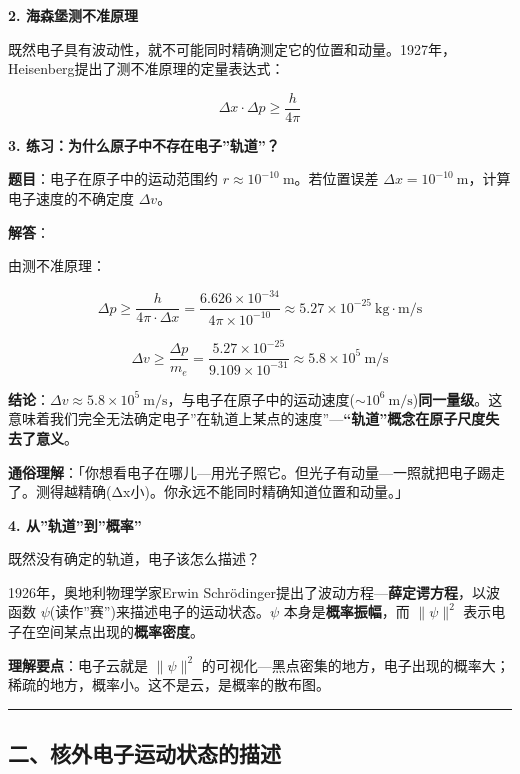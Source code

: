 \textbf{2. 海森堡测不准原理}

既然电子具有波动性，就不可能同时精确测定它的位置和动量。1927年，Heisenberg提出了测不准原理的定量表达式：

\[
\boxed{\Delta x \cdot \Delta p \geq \frac{h}{4\pi}}
\]

\textbf{3. 练习：为什么原子中不存在电子''轨道''？}

\textbf{题目}：电子在原子中的运动范围约 \(r \approx 10^{-10}\ \mathrm{m}\)。若位置误差 \(\Delta x = 10^{-10}\ \mathrm{m}\)，计算电子速度的不确定度 \(\Delta v\)。

\textbf{解答}：

由测不准原理：

\[\Delta p \geq \frac{h}{4\pi \cdot \Delta x} = \frac{6.626\times 10^{-34}}{4\pi \times 10^{-10}} \approx 5.27\times 10^{-25}\ \mathrm{kg\cdot m/s}\]

\[\Delta v \geq \frac{\Delta p}{m_e} = \frac{5.27\times 10^{-25}}{9.109\times 10^{-31}} \approx 5.8\times 10^5\ \mathrm{m/s}\]

\textbf{结论}：\(\Delta v \approx 5.8\times 10^5\ \mathrm{m/s}\)，与电子在原子中的运动速度(\(\sim 10^6\ \mathrm{m/s}\))\textbf{同一量级}。这意味着我们完全无法确定电子''在轨道上某点的速度''---\textbf{``轨道''概念在原子尺度失去了意义}。

\textbf{通俗理解}：「你想看电子在哪儿---用光子照它。但光子有动量---一照就把电子踢走了。测得越精确(Δx小)。你永远不能同时精确知道位置和动量。」

\textbf{4. 从''轨道''到''概率''}

既然没有确定的轨道，电子该怎么描述？

1926年，奥地利物理学家Erwin Schrödinger提出了波动方程---\textbf{薛定谔方程}，以波函数 \(\psi\)(读作''赛'')来描述电子的运动状态。\(\psi\) 本身是\textbf{概率振幅}，而 \(\|\psi\|^2\) 表示电子在空间某点出现的\textbf{概率密度}。

\textbf{理解要点}：电子云就是 \(\|\psi\|^2\) 的可视化---黑点密集的地方，电子出现的概率大；稀疏的地方，概率小。这不是云，是概率的散布图。

\begin{center}\rule{0.5\linewidth}{0.5pt}\end{center}

\subsection{二、核外电子运动状态的描述}\label{ux4e8cux6838ux5916ux7535ux5b50ux8fd0ux52a8ux72b6ux6001ux7684ux63cfux8ff0}

